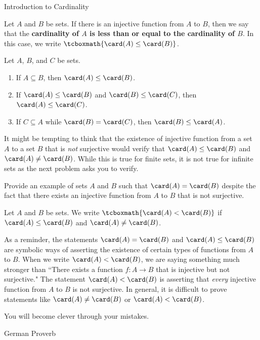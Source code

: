 \begin{section}{Introduction to Cardinality}
\begin{definition}
Let $A$ and $B$ be sets. If there is an injective function from $A$ to $B$, then we say that the \textbf{cardinality of $A$ is less than or equal to the cardinality of $B$}. In this case, we write $\tcboxmath{\card(A)\leq\card(B)}$.
\end{definition}

\begin{theorem}
Let $A$, $B$, and $C$ be sets.
\begin{enumerate}[label=\textrm{(\alph*)}]
\item If $A\subseteq B$, then $\card(A)\leq \card(B)$.
\item If $\card(A)\leq \card(B)$ and $\card(B)\leq \card(C)$, then $\card(A)\leq \card(C)$.
\item If $C\subseteq A$ while $\card(B)=\card(C)$, then $\card(B)\leq \card(A)$.
\end{enumerate}
\end{theorem}

It might be tempting to think that the existence of injective function from a set $A$ to a set $B$ that is \emph{not} surjective would verify that $\card(A)\leq \card(B)$ and $\card(A)\neq \card(B)$. While this is true for finite sets, it is not true for infinite sets as the next problem asks you to verify.

\begin{problem}
Provide an example of sets $A$ and $B$ such that $\card(A)=\card(B)$ despite the fact that there exists an injective function from $A$ to $B$ that is not surjective.
\end{problem}

\begin{definition}
Let $A$ and $B$ be sets. We write $\tcboxmath{\card(A)< \card(B)}$ if $\card(A)\leq \card(B)$ and $\card(A)\neq \card(B)$.
\end{definition}

As a reminder, the statements $\card(A)= \card(B)$ and $\card(A)\leq \card(B)$ are symbolic ways of asserting the existence of certain types of functions from $A$ to $B$. When we write $\card(A)<\card(B)$, we are saying something much stronger than ``There exists a function $f:A\to B$ that is injective but not surjective." The statement $\card(A)<\card(B)$ is asserting that \emph{every} injective function from $A$ to $B$ is not surjective. In general, it is difficult to prove statements like $\card(A)\neq \card(B)$ or $\card(A)<\card(B)$.

\epigraph{You will become clever through your mistakes.}{German Proverb}

\end{section}